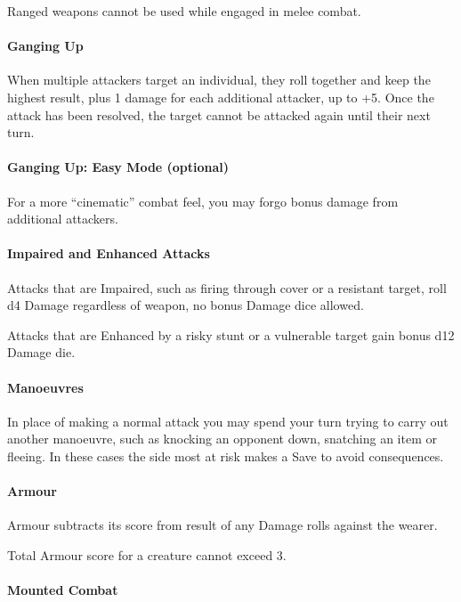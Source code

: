 \documentclass[itdr]{subfiles}
\begin{document}
Ranged weapons cannot be used while engaged in melee combat.

\paragraph{Ganging Up}
When multiple attackers target an individual, they roll together and keep the highest result, plus 1 damage for each additional attacker, up to +5. Once the attack has been resolved, the target cannot be attacked again until their next turn.

\begin{dbox}
\paragraph{Ganging Up: Easy Mode (optional)}
For a more ``cinematic'' combat feel, you may forgo bonus damage from additional attackers.
\end{dbox}

\paragraph{Impaired and Enhanced Attacks}
Attacks that are Impaired, such as firing through cover or a resistant target, roll d4 Damage regardless of weapon, no bonus Damage dice allowed.

Attacks that are Enhanced by a risky stunt or a vulnerable target gain bonus d12 Damage die.

\paragraph{Manoeuvres}
In place of making a normal attack you may spend your turn trying to carry out another manoeuvre, such as knocking an opponent down, snatching an item or fleeing. In these cases the side most at risk makes a Save to avoid consequences.

\paragraph{Armour}
Armour subtracts its score from result of any Damage rolls against the wearer.

Total Armour score for a creature cannot exceed 3.

\paragraph{Mounted Combat}
\end{document}
